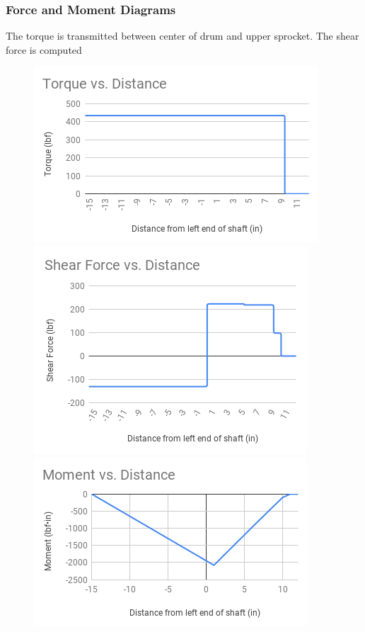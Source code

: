 \documentclass[letterpaper,12pt]{article}
\begin{document}
\subsubsection{Force and Moment Diagrams}
The torque is transmitted between center of drum and upper sprocket. The shear force is computed 
\begin{figure}[!htb]
  \includegraphics[width=\linewidth]{A3/torque_diagram.png}
\endminipage\hfill
{}
  \includegraphics[width=\linewidth]{A3/shear_force_diagram.png}
\endminipage\hfill
{}%
  \includegraphics[width=\linewidth]{A3/moment_diagram.png}

\endminipage
\end{figure}
\end{document}
